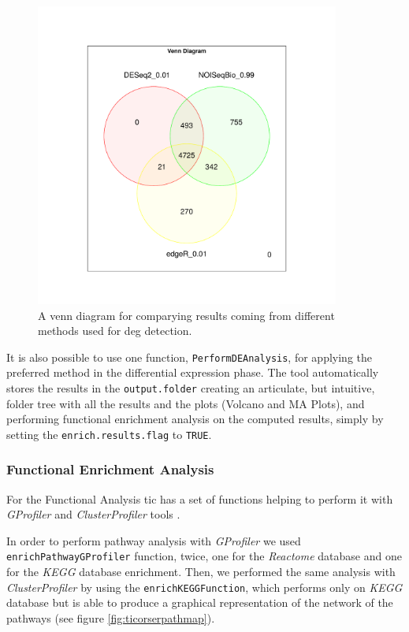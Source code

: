 \begin{figure}[H]
\centering
\includegraphics[width=10cm, keepaspectratio]{img/ticorser/de/singleTP/venn.pdf}
\caption[ticorser venn diagram single time point]{A venn diagram for comparying results coming from different methods used for \gls{deg} detection.}
\label{fig:ticorsertpvenn}
\end{figure}

It is also possible to use one function, \lstinline!PerformDEAnalysis!, for applying the preferred method in the differential expression phase. 
The tool automatically stores the results in the \lstinline!output.folder! creating an articulate, but intuitive, folder tree with all the results and the plots (Volcano and MA Plots), and performing functional enrichment analysis on the computed results, simply by setting the \lstinline!enrich.results.flag! to \lstinline!TRUE!.

\subsubsection{Functional Enrichment Analysis}

For the Functional Analysis \gls{tic} has a set of functions helping to perform it with \textit{GProfiler} and \textit{ClusterProfiler} tools \cite{Yu2012, Reimand2016}.

In order to perform pathway analysis with \textit{GProfiler} we used \lstinline!enrichPathwayGProfiler! function, twice, one for the \textit{Reactome} database and one for the \textit{KEGG} database enrichment.
Then, we performed the same analysis with \textit{ClusterProfiler} by using the \lstinline!enrichKEGGFunction!, which performs only on \textit{KEGG} database but is able to produce a graphical representation of the network of the pathways (see figure \ref{fig:ticorserpathmap}).

